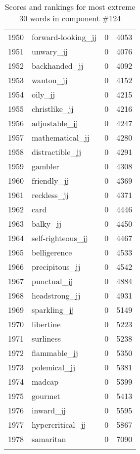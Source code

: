 \begin{longtable}[!htbp]{| rlr@{.}l |}
    1950 & forward-looking\_jj & 0 & 4053 \\
    1951 & unwary\_jj & 0 & 4076 \\
    1952 & backhanded\_jj & 0 & 4092 \\
    1953 & wanton\_jj & 0 & 4152 \\
    1954 & oily\_jj & 0 & 4215 \\
    1955 & christlike\_jj & 0 & 4216 \\
    1956 & adjustable\_jj & 0 & 4247 \\
    1957 & mathematical\_jj & 0 & 4280 \\
    1958 & distractible\_jj & 0 & 4291 \\
    1959 & gambler & 0 & 4308 \\
    1960 & friendly\_jj & 0 & 4369 \\
    1961 & reckless\_jj & 0 & 4371 \\
    1962 & card & 0 & 4446 \\
    1963 & balky\_jj & 0 & 4450 \\
    1964 & self-righteous\_jj & 0 & 4467 \\
    1965 & belligerence & 0 & 4533 \\
    1966 & precipitous\_jj & 0 & 4542 \\
    1967 & punctual\_jj & 0 & 4884 \\
    1968 & headstrong\_jj & 0 & 4931 \\
    1969 & sparkling\_jj & 0 & 5149 \\
    1970 & libertine & 0 & 5223 \\
    1971 & surliness & 0 & 5238 \\
    1972 & flammable\_jj & 0 & 5350 \\
    1973 & polemical\_jj & 0 & 5381 \\
    1974 & madcap & 0 & 5399 \\
    1975 & gourmet & 0 & 5413 \\
    1976 & inward\_jj & 0 & 5595 \\
    1977 & hypercritical\_jj & 0 & 5867 \\
    1978 & samaritan & 0 & 7090 \\
    \hline
    \caption{Scores and rankings for most extreme 30 words in component \#124} \\
\end{longtable}
